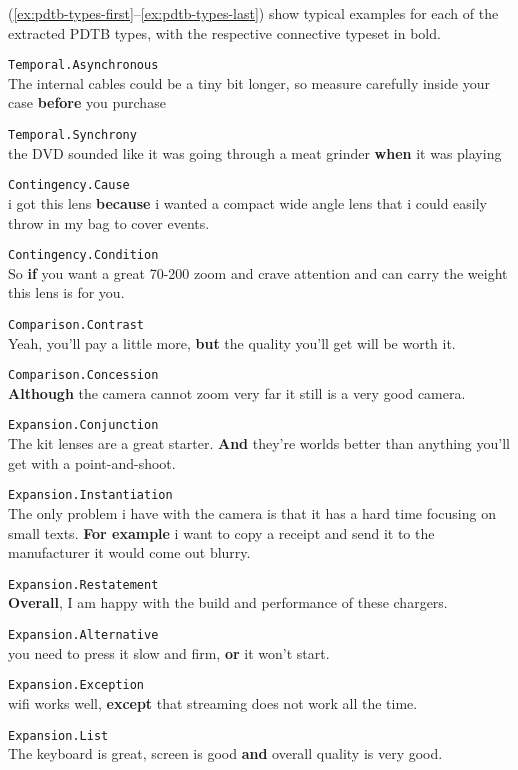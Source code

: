 \documentclass[
    a4paper,%
    12pt,%
    oneside,%
    toc=bibliography,
    final,
]{scrartcl}
\begin{document}
(\ref{ex:pdtb-types-first}–\ref{ex:pdtb-types-last}) show typical examples for each of the extracted PDTB types, with the respective connective typeset in bold.

\begin{exe}
\ex\label{ex:pdtb-types-first} \lstinline|Temporal.Asynchronous|\\
The internal cables could be a tiny bit longer, so measure carefully inside your case \textbf{before} you purchase

\ex \lstinline|Temporal.Synchrony|\\
the DVD sounded like it was going through a meat grinder \textbf{when} it was playing

\ex \lstinline|Contingency.Cause|\\
i got this lens \textbf{because} i wanted a compact wide angle lens that i could easily throw in my bag to cover events.

\ex \lstinline|Contingency.Condition|\\
So \textbf{if} you want a great 70-200 zoom and crave attention and can carry the weight this lens is for you.

\ex \lstinline|Comparison.Contrast|\\
Yeah, you'll pay a little more, \textbf{but} the quality you'll get will be worth it.

\ex \lstinline|Comparison.Concession|\\
\textbf{Although} the camera cannot zoom very far it still is a very good camera.

\ex \lstinline|Expansion.Conjunction|\\
The kit lenses are a great starter. \textbf{And} they're worlds better than anything you'll get with a point-and-shoot.

\ex \lstinline|Expansion.Instantiation|\\
The only problem i have with the camera is that it has a hard time focusing on small texts. \textbf{For example} i want to copy a receipt and send it to the manufacturer it would come out blurry.

\ex \lstinline|Expansion.Restatement|\\
\textbf{Overall}, I am happy with the build and performance of these chargers.

\ex \lstinline|Expansion.Alternative|\\
you need to press it slow and firm, \textbf{or} it won't start.

\ex \lstinline|Expansion.Exception|\\
wifi works well, \textbf{except} that streaming does not work all the time.

\ex\label{ex:pdtb-types-last} \lstinline|Expansion.List|\\
The keyboard is great, screen is good \textbf{and} overall quality is very good.
\end{exe}
\end{document}
